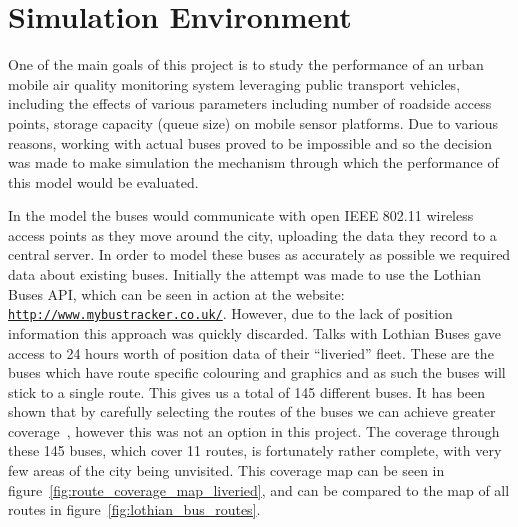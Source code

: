 \chapter{Simulation Environment}\label{simulation}
    
    One of the main goals of this project is to study the performance of an urban mobile air quality monitoring system leveraging public transport vehicles, including the effects of various parameters including number of roadside access points, storage capacity (queue size) on mobile sensor platforms. Due to various reasons, working with actual buses proved to be impossible and so the decision was made to make simulation the mechanism through which the performance of this model would be evaluated. 

    In the model the buses would communicate with open IEEE 802.11 wireless access points as they move around the city, uploading the data they record to a central server. In order to model these buses as accurately as possible we required data about existing buses. Initially the attempt was made to use the Lothian Buses API, which can be seen in action at the website: \href{http://www.mybustracker.co.uk/}{\nolinkurl{http://www.mybustracker.co.uk/}}. However, due to the lack of position information this approach was quickly discarded. Talks with Lothian Buses gave access to 24 hours worth of position data of their ``liveried'' fleet. These are the buses which have route specific colouring and graphics and as such the buses will stick to a single route. This gives us a total of 145 different buses. It has been shown that by carefully selecting the routes of the buses we can achieve greater coverage~\cite{opensenserouteselection}, however this was not an option in this project. The coverage through these 145 buses, which cover 11 routes, is fortunately rather complete, with very few areas of the city being unvisited. This coverage map can be seen in figure~\ref{fig:route_coverage_map_liveried}, and can be compared to the map of all routes in figure~\ref{fig:lothian_bus_routes}.



